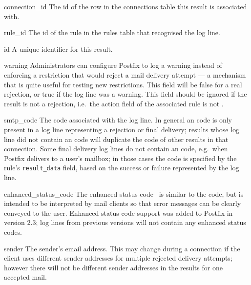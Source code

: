 \begin{boldeqlist}

    \item [connection\_id] The id of the row in the connections table this
        result is associated with.

    \item [rule\_id] The id of the rule in the rules table that recognised
        the log line.

    \item [id] A unique identifier for this result.

    \item [warning] Administrators can configure Postfix to log a warning
        instead of enforcing a restriction that would reject a mail
        delivery attempt --- a mechanism that is quite useful for testing
        new restrictions.  This field will be false for a real rejection,
        or true if the log line was a warning.  This field should be
        ignored if the result is not a rejection, i.e.\ the action field of
        the associated rule is not .

    \item [smtp\_code] The  code associated with the log
        line.  In general an  code is only present in a log
        line representing a rejection or final delivery; results whose log
        line did not contain an  code will duplicate the
         code of other results in that connection.  Some
        final delivery log lines do not contain an  code,
        e.g.\ when Postfix delivers to a user's mailbox; in those cases the
         code is specified by the rule's
        \texttt{result\_data} field, based on the success or failure
        represented by the log line.

    \item [enhanced\_status\_code] The enhanced status code~\cite{RFC3463}
        is similar to the  code, but is intended to be
        interpreted by mail clients so that error messages can be clearly
        conveyed to the user.  Enhanced status code support was added to
        Postfix in version 2.3; log lines from previous versions will not
        contain any enhanced status codes.

    \item [sender] The sender's email address.  This may change during a
        connection if the client uses different sender addresses for
        multiple rejected delivery attempts; however there will not be
        different sender addresses in the results for one accepted mail.


\end{boldeqlist}
